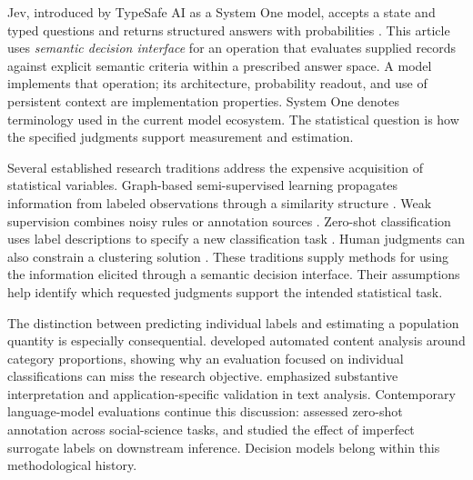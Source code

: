 \documentclass[11pt,a4paper]{article}
\begin{document}
Jev, introduced by TypeSafe AI as a System One model, accepts a state and typed questions and returns structured answers with probabilities \citep{typesafe-intro}. This article uses \emph{semantic decision interface} for an operation that evaluates supplied records against explicit semantic criteria within a prescribed answer space. A model implements that operation; its architecture, probability readout, and use of persistent context are implementation properties. System One denotes terminology used in the current model ecosystem. The statistical question is how the specified judgments support measurement and estimation.

Several established research traditions address the expensive acquisition of statistical variables. Graph-based semi-supervised learning propagates information from labeled observations through a similarity structure \citep{zhu2003}. Weak supervision combines noisy rules or annotation sources \citep{ratner2017}. Zero-shot classification uses label descriptions to specify a new classification task \citep{yin2019}. Human judgments can also constrain a clustering solution \citep{wagstaff2001}. These traditions supply methods for using the information elicited through a semantic decision interface. Their assumptions help identify which requested judgments support the intended statistical task.

The distinction between predicting individual labels and estimating a population quantity is especially consequential. \citet{hopkins2010} developed automated content analysis around category proportions, showing why an evaluation focused on individual classifications can miss the research objective. \citet{grimmer2013} emphasized substantive interpretation and application-specific validation in text analysis. Contemporary language-model evaluations continue this discussion: \citet{ziems2024} assessed zero-shot annotation across social-science tasks, and \citet{egami2023} studied the effect of imperfect surrogate labels on downstream inference. Decision models belong within this methodological history.
\end{document}
